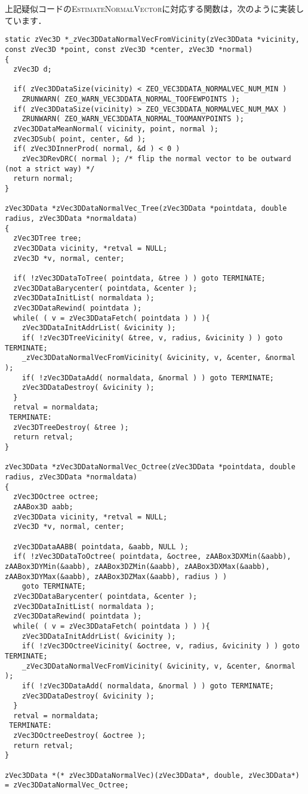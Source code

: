 ﻿\documentclass[a4paper]{jsarticle}
\begin{document}
上記疑似コードの\textsc{EstimateNormalVector}に対応する関数は，次のように実装しています．
\begin{screen}
\begin{verbatim}
static zVec3D *_zVec3DDataNormalVecFromVicinity(zVec3DData *vicinity, const zVec3D *point, const zVec3D *center, zVec3D *normal)
{
  zVec3D d;

  if( zVec3DDataSize(vicinity) < ZEO_VEC3DDATA_NORMALVEC_NUM_MIN )
    ZRUNWARN( ZEO_WARN_VEC3DDATA_NORMAL_TOOFEWPOINTS );
  if( zVec3DDataSize(vicinity) > ZEO_VEC3DDATA_NORMALVEC_NUM_MAX )
    ZRUNWARN( ZEO_WARN_VEC3DDATA_NORMAL_TOOMANYPOINTS );
  zVec3DDataMeanNormal( vicinity, point, normal );
  zVec3DSub( point, center, &d );
  if( zVec3DInnerProd( normal, &d ) < 0 )
    zVec3DRevDRC( normal ); /* flip the normal vector to be outward (not a strict way) */
  return normal;
}

zVec3DData *zVec3DDataNormalVec_Tree(zVec3DData *pointdata, double radius, zVec3DData *normaldata)
{
  zVec3DTree tree;
  zVec3DData vicinity, *retval = NULL;
  zVec3D *v, normal, center;

  if( !zVec3DDataToTree( pointdata, &tree ) ) goto TERMINATE;
  zVec3DDataBarycenter( pointdata, &center );
  zVec3DDataInitList( normaldata );
  zVec3DDataRewind( pointdata );
  while( ( v = zVec3DDataFetch( pointdata ) ) ){
    zVec3DDataInitAddrList( &vicinity );
    if( !zVec3DTreeVicinity( &tree, v, radius, &vicinity ) ) goto TERMINATE;
    _zVec3DDataNormalVecFromVicinity( &vicinity, v, &center, &normal );
    if( !zVec3DDataAdd( normaldata, &normal ) ) goto TERMINATE;
    zVec3DDataDestroy( &vicinity );
  }
  retval = normaldata;
 TERMINATE:
  zVec3DTreeDestroy( &tree );
  return retval;
}

zVec3DData *zVec3DDataNormalVec_Octree(zVec3DData *pointdata, double radius, zVec3DData *normaldata)
{
  zVec3DOctree octree;
  zAABox3D aabb;
  zVec3DData vicinity, *retval = NULL;
  zVec3D *v, normal, center;

  zVec3DDataAABB( pointdata, &aabb, NULL );
  if( !zVec3DDataToOctree( pointdata, &octree, zAABox3DXMin(&aabb), zAABox3DYMin(&aabb), zAABox3DZMin(&aabb), zAABox3DXMax(&aabb), zAABox3DYMax(&aabb), zAABox3DZMax(&aabb), radius ) )
    goto TERMINATE;
  zVec3DDataBarycenter( pointdata, &center );
  zVec3DDataInitList( normaldata );
  zVec3DDataRewind( pointdata );
  while( ( v = zVec3DDataFetch( pointdata ) ) ){
    zVec3DDataInitAddrList( &vicinity );
    if( !zVec3DOctreeVicinity( &octree, v, radius, &vicinity ) ) goto TERMINATE;
    _zVec3DDataNormalVecFromVicinity( &vicinity, v, &center, &normal );
    if( !zVec3DDataAdd( normaldata, &normal ) ) goto TERMINATE;
    zVec3DDataDestroy( &vicinity );
  }
  retval = normaldata;
 TERMINATE:
  zVec3DOctreeDestroy( &octree );
  return retval;
}

zVec3DData *(* zVec3DDataNormalVec)(zVec3DData*, double, zVec3DData*) = zVec3DDataNormalVec_Octree;
\end{verbatim}
\end{screen}
\end{document}
